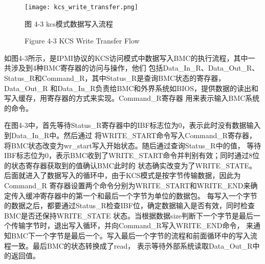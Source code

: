 \begin{figure}[htb]
    \label{ffs_format}
    \vspace{0cm}   
    \setlength{\abovecaptionskip}{0.3cm}
	\centering
    \texttt{[image: kcs\_write\_transfer.png]}
    \caption*{图 4-3 kcs模式数据写入流程}
    \setlength{\belowcaptionskip}{-0.7cm}
    \caption*{Figure 4-3 KCS Write Transfer Flow}
\end{figure}

如图4-3所示，是IPMI协议的KCS访问模式中数据写入BMC的执行流程，其中一共涉及到4种BMC寄存器的访问与操作，他们
包括Data\_In\_R、Data\_Out\_R、Status\_R和Command\_R，其中Status\_R是查询BMC状态的寄存器，Data\_Out\_R
和Data\_In\_R负责给BMC和外界系统如BIOS，提供数据的读出和写入缓存，用寄存器的方式来实现。Command\_R寄存器
用来表示输入BMC系统的命令。
\par 在图4-3中，首先等待Status\_R寄存器中的IBF标志位为0，表示此时没有数据输入到Data\_In\_R中。然后通过
将WRITE\_START命令写入Command\_R寄存器，将BMC状态改变为wr\_start写入开始状态。随后通过查询Status\_R中的值，
等待IBF标志位为0，表示BMC收到了WRITE\_START命令并判别有效；同时通过8位的状态寄存器获取到的值确认BMC此时的
状态确实改变为了WRITE\_STATE。后面就进入了数据写入的循环中，由于KCS模式是按字节传输数据，因此为Command\_R
寄存器设置两个命令分别为WRITE\_START和WRITE\_END来确定传入缓冲寄存器中的第一个和最后一个字节为单位的数据包。
每写入一个字节的数据之后，都要通过Status\_R检查IBF位，确定数据输入是否有效，同时检查BMC是否还保持WRITE\_STATE
状态。当根据数据size判断下一个字节是最后一个传输字节时，退出写入循环，并向Command\_R写入WRITE\_END命令，
来通知BMC下一个字节是最后一个。写入最后一个字节的流程和前面循环中的写入流程一致。最后BMC的状态转换成了read，
表示等待外部系统读取Data\_Out\_R中的返回值。

